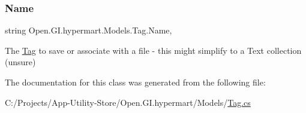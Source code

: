 \subsubsection{\texorpdfstring{Name}{Name}}
{\footnotesize\ttfamily string Open.\+G\+I.\+hypermart.\+Models.\+Tag.\+Name\hspace{0.3cm}{\ttfamily [get]}, {\ttfamily [set]}}



The \hyperlink{class_open_1_1_g_i_1_1hypermart_1_1_models_1_1_tag}{Tag} to save or associate with a file -\/ this might simplify to a Text collection (unsure) 



The documentation for this class was generated from the following file\+:\begin{DoxyCompactItemize}
\item 
C\+:/\+Projects/\+App-\/\+Utility-\/\+Store/\+Open.\+G\+I.\+hypermart/\+Models/\hyperlink{_tag_8cs}{Tag.\+cs}\end{DoxyCompactItemize}
